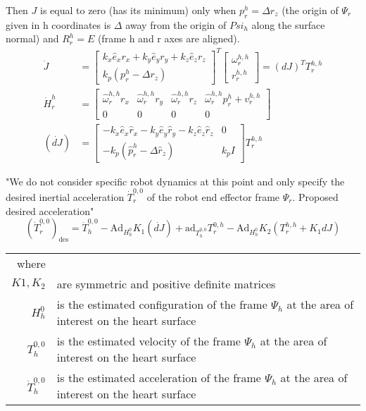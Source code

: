 Then $J$ is equal to zero (has its minimum) only when $p^h_r=\Delta r_z$ (the origin of $\Psi_r$ given in h coordinates is $\Delta$ away from the origin of $Psi_h$ along the surface normal) and $R^h_r=E$ (frame h and r axes are aligned).
\begin{align}
\dot{J} &= 
\begin{bmatrix}
k_x \hat{e}_x r_x + k_y \hat{e}_y r_y + k_z \hat{e}_z r_z\\
k_p(p^h_r - \Delta r_z)
\end{bmatrix}^T
\begin{bmatrix}
\omega^{h,h}_r \\
r^{h,h}_r
\end{bmatrix}
= (dJ)^T T^{h,h}_r\\
\dot{H}^h_r &= 
\begin{bmatrix}
\hat{\omega}^{h,h}_r r_x & \hat{\omega}^{h,h}_r r_y & \hat{\omega}^{h,h}_r r_z & \hat{\omega}^{h,h}_r p^h_r + v^{h,h}_r\\
0 & 0 & 0 & 0
\end{bmatrix}\\
(\dot{dJ}) &=
\begin{bmatrix}
-k_x \hat{e}_x \hat{r}_x  - k_y \hat{e}_y \hat{r}_y - k_z \hat{e}_z \hat{r}_z & 0\\
-k_p(\hat{p}^h_r - \Delta \hat{r}_z) & k_p I
\end{bmatrix}
T^{h,h}_r
\end{align}

"We do not consider specific robot dynamics at this point and only specify the desired inertial acceleration $\dot{T}^{0,0}_r$ of the robot end effector frame $\Psi_r$. Proposed desired acceleration"
\begin{equation}
\left(\dot{T}^{0,0}_r\right)_\text{des} = \dot{T}^{0,0}_h - \text{Ad}_{H^0_h} K_1 (\dot{dJ}) + \text{ad}_{T^{0,0}_h} T^{0,h}_r - \text{Ad}_{H^0_h} K_2 (T^{h,h}_r + K_1 dJ)
\end{equation}
\begin{tabular}{rl}
	where & \\
	$K1, K_2$ & are symmetric and positive definite matrices\\
	$H^0_h$ & is the estimated configuration of the frame $\Psi_h$ at the area of interest on the heart surface\\
	$T^{0,0}_h$ & is the estimated velocity of the frame $\Psi_h$ at the area of interest on the heart surface\\
	$\dot{T}^{0,0}_h$ & is the estimated acceleration of the frame $\Psi_h$ at the area of interest on the heart surface\\
\end{tabular}\\

